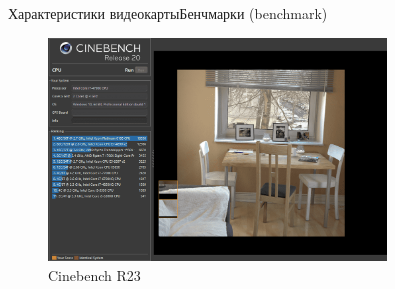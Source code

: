 \documentclass{beamer}
\begin{document}
\begin{frame}{Характеристики видеокарты}{Бенчмарки (benchmark)} 
	\begin{figure} 
		\includegraphics[width=0.8\textwidth]{images/Cinebench.png}
		\caption {Cinebench R23}
	\end{figure}
	

\end{frame}
\end{document}
